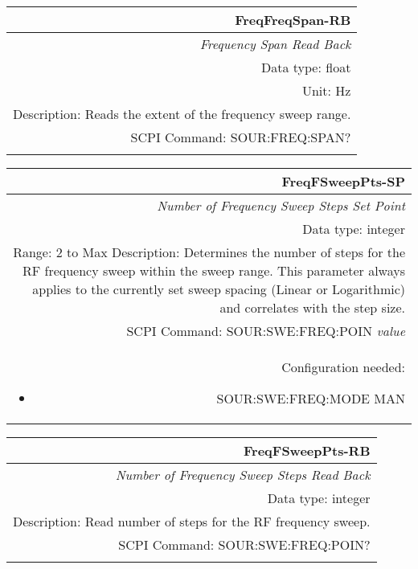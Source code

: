 \documentclass[openany]{article}
\begin{document}
		\begin{tabular}{N}
			\hline
			\bfseries FreqFreqSpan-RB \\ \hline
			\emph{Frequency Span Read Back} \\
			Data type: float \\
			Unit: Hz \\
			Description: Reads the extent of the frequency sweep range. \\
			SCPI Command: SOUR:FREQ:SPAN? \\
			\\

		\end{tabular}


		\begin{tabular}{N}
			\hline
			\bfseries FreqFSweepPts-SP \\ \hline
			\emph{Number of Frequency Sweep Steps Set Point} \\
			Data type: integer \\
			Range: 2 to Max
			Description: Determines the number of steps for the RF frequency sweep within the sweep range. This parameter always applies to the currently set sweep spacing (Linear or Logarithmic) and correlates with the step size. \\
			SCPI Command: SOUR:SWE:FREQ:POIN \emph{value} \\
			Configuration needed: \begin{itemize}[noitemsep]
				\small
				\item[] SOUR:SWE:FREQ:MODE MAN
			\end{itemize} \\
		
		\end{tabular}


		\begin{tabular}{N}
			\hline
			\bfseries FreqFSweepPts-RB \\ \hline
			\emph{Number of Frequency Sweep Steps Read Back} \\
			Data type: integer \\
			Description: Read number of steps for the RF frequency sweep. \\
			SCPI Command: SOUR:SWE:FREQ:POIN? \\
			\\

		\end{tabular}
\end{document}
